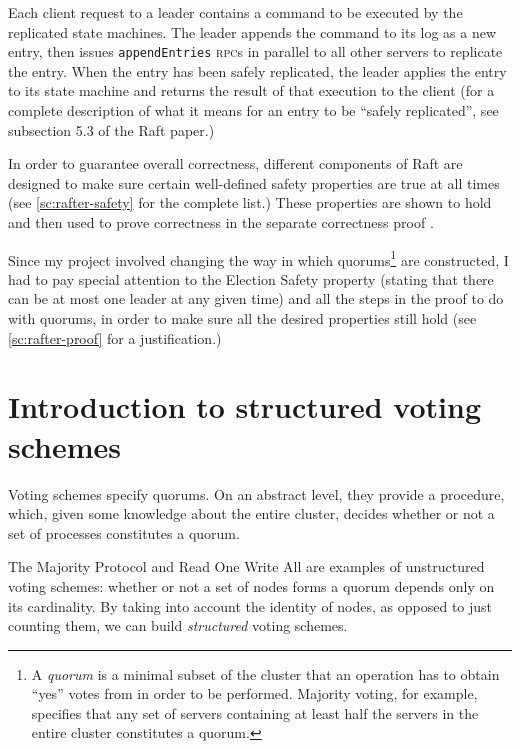 \documentclass[11pt,chapterprefix=true,toc=bibliography,numbers=noendperiod,
               footnotes=multiple,twoside]{scrreprt}
\newcommand{\appendEntriesRPC}[0]{\texttt{appendEntries} \textsc{rpc}}
\begin{document}
Each client request to a leader contains a command to be executed by the replicated state machines. The leader appends the command to its log as a new entry, then issues \appendEntriesRPC s in parallel to all other servers to replicate the entry. When the entry has been safely replicated, the leader applies the entry to its state machine and returns the result of that execution to the client (for a complete description of what it means for an entry to be \enquote{safely replicated}, see subsection 5.3 of the Raft paper.)


In order to guarantee overall correctness, different components of Raft are designed to make sure certain well-defined safety properties are true at all times (see \cref{sc:rafter-safety} for the complete list.) These properties are shown to hold and then used to prove correctness in the separate correctness proof \autocite{raftproof}.

Since my project involved changing the way in which quorums\footnote{A \emph{quorum} is a minimal subset of the cluster that an operation has to obtain \enquote{yes} votes from in order to be performed. Majority voting, for example, specifies that any set of servers containing at least half the servers in the entire cluster constitutes a quorum.} are constructed, I had to pay special attention to the Election Safety property (stating that there can be at most one leader at any given time) and all the steps in the proof to do with quorums, in order to make sure all the desired properties still hold (see \cref{sc:rafter-proof} for a justification.)

\section{Introduction to structured voting schemes\label{ssc:structured-voting-schemes}}

Voting schemes specify quorums. On an abstract level, they provide a procedure, which, given some knowledge about the entire cluster, decides whether or not a set of processes constitutes a quorum.

The Majority Protocol and Read One Write All are examples of unstructured voting schemes: whether or not a set of nodes forms a quorum depends only on its cardinality. By taking into account the identity of nodes, as opposed to just counting them, we can build \emph{structured} voting schemes.

\end{document}
